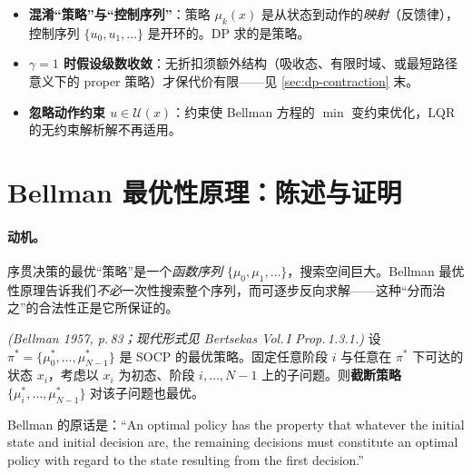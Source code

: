 \begin{tcolorbox}[colback=red!4,colframe=red!55!black,title=陷阱专栏：三个最常见的形式化错误]
\begin{itemize}
  \item \textbf{混淆“策略”与“控制序列”}：策略 $\mu_k(x)$ 是从状态到动作的\emph{映射}（反馈律），控制序列 $\{u_0,u_1,\dots\}$ 是开环的。DP 求的是策略。
  \item \textbf{$\gamma=1$ 时假设级数收敛}：无折扣须额外结构（吸收态、有限时域、或最短路径意义下的 proper 策略）才保代价有限——见 \cref{sec:dp-contraction} 末。
  \item \textbf{忽略动作约束 $u\in\mathcal U(x)$}：约束使 Bellman 方程的 $\min$ 变约束优化，LQR 的无约束解析解不再适用。
\end{itemize}
\end{tcolorbox}

\section{Bellman 最优性原理：陈述与证明}
\label{sec:dp-optprinciple}

\paragraph{动机。}
序贯决策的最优“策略”是一个\emph{函数序列} $\{\mu_0,\mu_1,\dots\}$，搜索空间巨大。Bellman 最优性原理告诉我们\emph{不必}一次性搜索整个序列，而可逐步反向求解——这种“分而治之”的合法性正是它所保证的。

\begin{theorem}\label{thm:dp-optimality}
\emph{(Bellman 1957\cite{bellman1957dp}, p.\,83；现代形式见 Bertsekas Vol.\,I Prop.\,1.3.1\cite{bertsekas2017dpoc1}.)}
设 $\pi^*=\{\mu_0^*,\dots,\mu_{N-1}^*\}$ 是 SOCP 的最优策略。固定任意阶段 $i$ 与任意在 $\pi^*$ 下可达的状态 $x_i$，考虑以 $x_i$ 为初态、阶段 $i,\dots,N-1$ 上的子问题。则\textbf{截断策略} $\{\mu_i^*,\dots,\mu_{N-1}^*\}$ 对该子问题也最优。
\end{theorem}

Bellman 的原话是：“An optimal policy has the property that whatever the initial state and initial decision are, the remaining decisions must constitute an optimal policy with regard to the state resulting from the first decision.”

